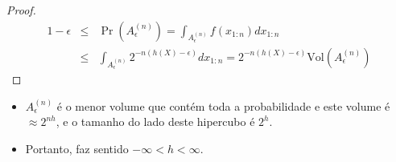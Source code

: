 \begin{frame}[allowframebreaks]
\begin{proof}
  \begin{eqnarray}
  1 - \epsilon &\leq& \Pr(A_{\epsilon}^{(n)}) = \int_{A_{\epsilon}^{(n)}} f(x_{1:n}) dx_{1:n} \\
	&\leq& \int_{A_{\epsilon}^{(n)}}  2^{-n(h(X) - \epsilon)} dx_{1:n} =  2^{-n(h(X) - \epsilon)} \text{Vol}(A_{\epsilon}^{(n)})
  \end{eqnarray}
  \end{proof}

  \begin{itemize}
  \item $A_{\epsilon}^{(n)}$ é o menor volume que contém toda a probabilidade e este volume é $\approx 2^{nh}$, e 
	o tamanho do lado deste hipercubo é $2^h$.
  \item Portanto, faz sentido $- \infty < h < \infty$.
  \end{itemize}
\end{frame}

